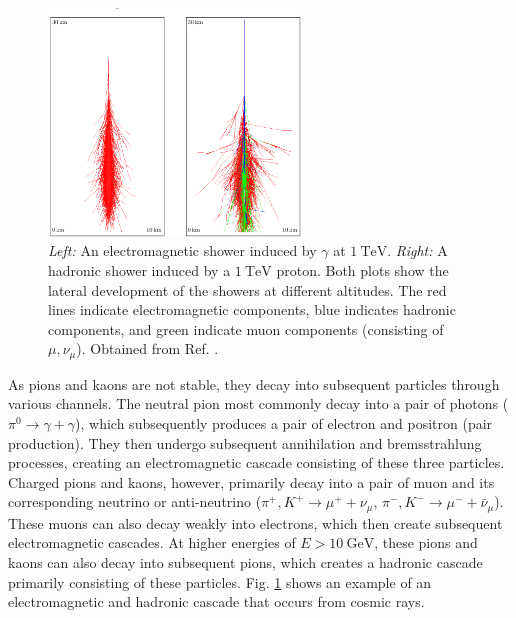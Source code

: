 \documentclass[a4paper]{report}
\numberwithin{equation}{section}
\begin{document}
\begin{figure}[!h]
	\centering
	\includegraphics[width=0.6\textwidth]{em_hadronic_showers.png}
	\caption{ \textit{Left:} An electromagnetic shower induced by $\gamma$ at $\SI{1}{\tera\electronvolt}$. 
				\textit{Right: } A hadronic shower induced by a $\SI{1}{\tera\electronvolt}$ proton. Both plots show the lateral
				development of the showers at different altitudes. The red lines indicate electromagnetic components, blue indicates 
				hadronic components, and green indicate muon components (consisting of $\mu, \nu_\mu$). Obtained from Ref. \cite{Haeffner2014}. }
	\label{fig:em_had_showers}
\end{figure}

As pions and kaons are not stable, they decay into subsequent particles through various channels.  
The neutral pion most commonly decay into a pair of photons ($\pi^0 \rightarrow \gamma + \gamma$), which subsequently produces a pair of electron and positron (pair production). They then undergo 
subsequent annihilation and bremsstrahlung processes, creating an electromagnetic cascade consisting of these three particles. Charged 
pions and kaons, however, primarily decay into a pair of muon and its corresponding neutrino or anti-neutrino ($\pi^+, K^+ \rightarrow \mu^+ + \nu_\mu$, $\pi^-, 
K^- \rightarrow \mu^- + \bar{\nu}_\mu$). These muons can also decay weakly into electrons, which then create subsequent electromagnetic cascades.
At higher energies of $E > \SI{10}{\giga\electronvolt}$, these pions and kaons can also decay into subsequent pions, which 
creates a hadronic cascade primarily consisting of these particles. Fig. \ref{fig:em_had_showers} shows an example of an electromagnetic and hadronic cascade that occurs from cosmic rays.
\end{document}
